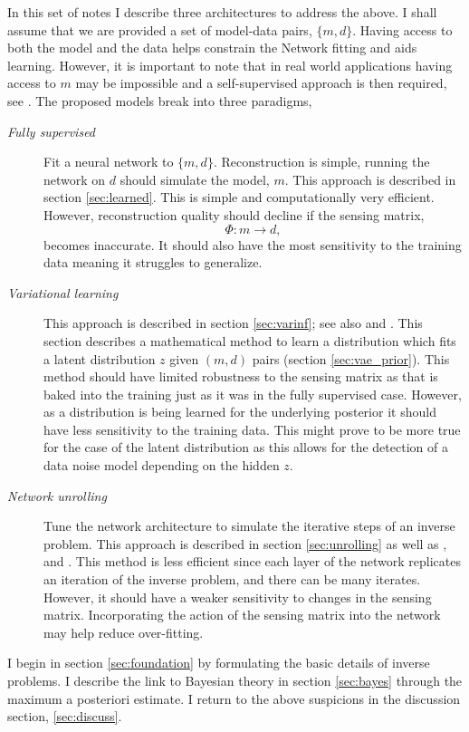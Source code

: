 \documentclass[12pt]{article}
\begin{document}
In this set of notes I describe three architectures to address the above. I shall assume that we are provided a set of model-data pairs, $\{m,d\}$. Having access to both the model and the data helps constrain the Network fitting and aids learning. However, it is important to note that in real world applications having access to $m$ may be impossible and a self-supervised approach is then required, see \cite{tachella}. The proposed models break into three paradigms,
\begin{description}
\item[\textit{Fully supervised}] \label{case:learned} Fit a neural network to $\{m,d\}$. Reconstruction is simple, running the network on $d$ should simulate the model, $m$. This approach is described in section \ref{sec:learned}. This is simple and computationally very efficient. However, reconstruction quality should decline if the sensing matrix,
\begin{equation}
\Phi: m \to d,
\end{equation} becomes inaccurate. It should also have the most sensitivity to the training data meaning it struggles to generalize.  
\item[\textit{Variational learning}] \label{case:vae} This approach is described in section \ref{sec:varinf}; see also \cite{vae} and \cite{bora}. This section describes a mathematical method to learn a distribution which fits a latent distribution $z$ given $(m,d)$ pairs (section \ref{sec:vae_prior}). This method should have limited robustness to the sensing matrix as that is baked into the training just as it was in the fully supervised case. However, as a distribution is being learned for the underlying posterior it should have less sensitivity to the training data. This might prove to be more true for the case of the latent distribution as this allows for the detection of a data noise model depending on the hidden $z$.  
\item[\textit{Network unrolling}] \label{case:unrolling} Tune the network architecture to simulate the iterative steps of an inverse problem. This approach is described in section \ref{sec:unrolling} as well as \cite{monga}, \cite{admmnet} and \cite{lista}. This method is less efficient since each layer of the network replicates an iteration of the inverse problem, and there can be many iterates. However, it should have  a weaker sensitivity to changes in the sensing matrix. Incorporating the action of the sensing matrix into the network may help reduce over-fitting.

\end{description}   
I begin in section \ref{sec:foundation} by formulating the basic details of inverse problems. I describe the link to Bayesian theory in section \ref{sec:bayes} through the maximum a posteriori estimate. I return to the above suspicions in the discussion section, \ref{sec:discuss}.
\end{document}
